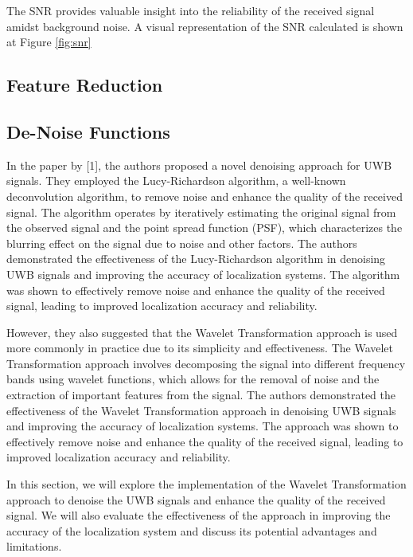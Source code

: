 \documentclass[
	article, %
	11pt, %
]{CSUniSchoolLabReport}
\begin{document}
The SNR provides valuable insight into the reliability of the received signal amidst background noise. A visual representation of the SNR calculated is shown at Figure \ref{fig:snr}

\subsection{Feature Reduction}\label{feature_reduction}

\subsection{De-Noise Functions}\label{de_noise_Functions}

In the paper by [1], the authors proposed a novel denoising approach for UWB signals. They employed the Lucy-Richardson algorithm, a well-known deconvolution algorithm, to remove noise and enhance the quality of the received signal. The algorithm operates by iteratively estimating the original signal from the observed signal and the point spread function (PSF), which characterizes the blurring effect on the signal due to noise and other factors. The authors demonstrated the effectiveness of the Lucy-Richardson algorithm in denoising UWB signals and improving the accuracy of localization systems. The algorithm was shown to effectively remove noise and enhance the quality of the received signal, leading to improved localization accuracy and reliability.

However, they also suggested that the Wavelet Transformation approach is used more commonly in practice due to its simplicity and effectiveness. The Wavelet Transformation approach involves decomposing the signal into different frequency bands using wavelet functions, which allows for the removal of noise and the extraction of important features from the signal. The authors demonstrated the effectiveness of the Wavelet Transformation approach in denoising UWB signals and improving the accuracy of localization systems. The approach was shown to effectively remove noise and enhance the quality of the received signal, leading to improved localization accuracy and reliability.

In this section, we will explore the implementation of the Wavelet Transformation approach to denoise the UWB signals and enhance the quality of the received signal. We will also evaluate the effectiveness of the approach in improving the accuracy of the localization system and discuss its potential advantages and limitations.
\end{document}
